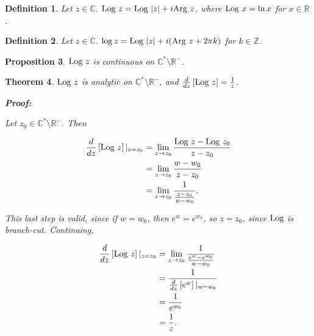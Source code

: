 \documentclass{article}
\theoremstyle{colontheorem}
\newtheorem{theorem}{Theorem}[section]
\newtheorem{proposition}[theorem]{Proposition}
\newtheorem{definition}[theorem]{Definition}
\newcommand{\Arg}{\textnormal{Arg }}
\newcommand{\Log}{\textnormal{Log }}
\newenvironment{Theorem}
{
	\begin{mdframed}[backgroundcolor=TheoremOrange!10]
	\begin{theorem}
}
{
	\end{theorem}
	\end{mdframed}
	
	\vspace{.15in}
}
\newenvironment{Proposition}
{
	\begin{mdframed}[backgroundcolor=TheoremOrange!10]
	\begin{proposition}
}
{
	\end{proposition}
	\end{mdframed}
	
	\vspace{.15in}
}
\newenvironment{Def}
{
	\begin{mdframed}[backgroundcolor=DefGreen!10]
	\begin{definition}
}
{
	\end{definition}
	\end{mdframed}
	
	\vspace{.15in}
}
\newenvironment{Proof}
{
	\begin{mdframed}[backgroundcolor=ProofPurple!10]
	\textbf{Proof:}%
}
{
	\end{mdframed}
	
	\vspace{.085in}
}
\begin{document}
\begin{Def}
	
	Let $z \in \mathbb{C}$. $\Log z = \Log |z| + i \Arg z$, where $\Log x = \ln x$ for $x \in \mathbb{R}$.
	
\end{Def}



\begin{Def}
	
	Let $z \in \mathbb{C}$. $\log z = \Log |z| + i (\Arg z + 2 \pi k)$ for $k \in \mathbb{Z}$.
	
\end{Def}



\begin{Proposition}
	
	$\Log z$ is continuous on $\mathbb{C}^* \setminus \mathbb{R}^-$.
	
\end{Proposition}



\begin{Theorem}
	
	$\Log z$ is analytic on $\mathbb{C}^* \setminus \mathbb{R}^-$, and $\frac{d}{dz} \left[ \Log z \right] = \frac{1}{z}$.
	
	\begin{Proof}
		Let $z_0 \in \mathbb{C}^* \setminus \mathbb{R}^-$. Then
		
		\begin{align*}
			\frac{d}{dz} \left[ \Log z \right] |_{z = z_0} &= \lim\limits_{z \to z_0} \frac{\Log z - \Log z_0}{z - z_0}\\
			&= \lim\limits_{z \to z_0} \frac{w - w_0}{z - z_0}\\
			&= \lim\limits_{z \to z_0} \frac{1}{\frac{z - z_0}{w - w_0}}.
		\end{align*}
		
		This last step is valid, since if $w = w_0$, then $e^w = e^{w_0}$, so $z = z_0$, since $\Log$is branch-cut. Continuing,
		
		\begin{align*}
			\frac{d}{dz} \left[ \Log z \right] |_{z = z_0} &= \lim\limits_{z \to z_0} \frac{1}{\frac{e^w - e^{w_0}}{w - w_0}}\\
			&= \frac{1}{\frac{d}{dz} \left[ e^w \right] |_{w = w_0}}\\
			&= \frac{1}{e^{w_0}}\\
			&= \frac{1}{z}.
		\end{align*}
		
	\end{Proof}
	
\end{Theorem}
\end{document}
